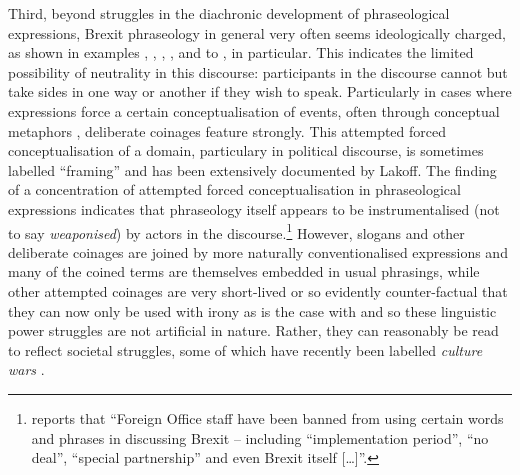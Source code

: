 \documentclass[output=paper]{langscibook}
\begin{document}
Third, beyond struggles in the diachronic development of phraseological expressions, Brexit phraseology in general very often seems ideologically charged, as shown in examples , , , ,  and  to , in particular. This indicates the limited possibility of neutrality in this discourse: participants in the discourse cannot but take sides in one way or another if they wish to speak. Particularly in cases where expressions force a certain conceptualisation of events, often through conceptual metaphors \citep{LakoffJohnson1980}, deliberate coinages feature strongly. This attempted forced conceptualisation of a domain, particulary in political discourse, is sometimes labelled ``framing'' \citep{Lakoff2010} and has been extensively documented by Lakoff. The finding of a concentration of attempted forced conceptualisation in phraseological expressions indicates that phraseology itself appears to be instrumentalised (not to say \textit{weaponised}) by actors in the discourse.\footnote{\citet{Wintour2020} reports that ``Foreign Office staff have been banned from using certain words and phrases in discussing Brexit -- including “implementation period”, “no deal”, “special partnership” and even Brexit itself […]''.} However, slogans and other deliberate coinages are joined by more naturally conventionalised expressions and many of the coined terms are themselves embedded in usual phrasings, while other attempted coinages are very short-lived or so evidently counter-factual that they can now only be used with irony as is the case with  and so these linguistic power struggles are not artificial in nature. Rather, they can reasonably be read to reflect societal struggles, some of which have recently been labelled \textit{culture wars} \citep{SobolewskaFord2020}.
\end{document}
